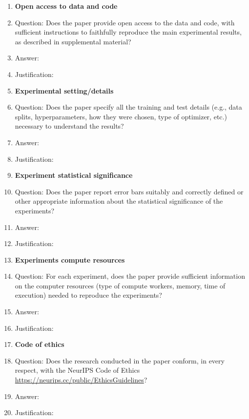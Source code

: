 \documentclass{article}
\begin{document}
\begin{enumerate}
\item {\bf Open access to data and code}
    \item[] Question: Does the paper provide open access to the data and code, with sufficient instructions to faithfully reproduce the main experimental results, as described in supplemental material?
    \item[] Answer: \answerTODO{} %
    \item[] Justification: \justificationTODO{}

\item {\bf Experimental setting/details}
    \item[] Question: Does the paper specify all the training and test details (e.g., data splits, hyperparameters, how they were chosen, type of optimizer, etc.) necessary to understand the results?
    \item[] Answer: \answerTODO{} %
    \item[] Justification: \justificationTODO{}

\item {\bf Experiment statistical significance}
    \item[] Question: Does the paper report error bars suitably and correctly defined or other appropriate information about the statistical significance of the experiments?
    \item[] Answer: \answerTODO{} %
    \item[] Justification: \justificationTODO{}

\item {\bf Experiments compute resources}
    \item[] Question: For each experiment, does the paper provide sufficient information on the computer resources (type of compute workers, memory, time of execution) needed to reproduce the experiments?
    \item[] Answer: \answerTODO{} %
    \item[] Justification: \justificationTODO{}

\item {\bf Code of ethics}
    \item[] Question: Does the research conducted in the paper conform, in every respect, with the NeurIPS Code of Ethics \url{https://neurips.cc/public/EthicsGuidelines}?
    \item[] Answer: \answerTODO{} %
    \item[] Justification: \justificationTODO{}


\end{enumerate}
\end{document}
